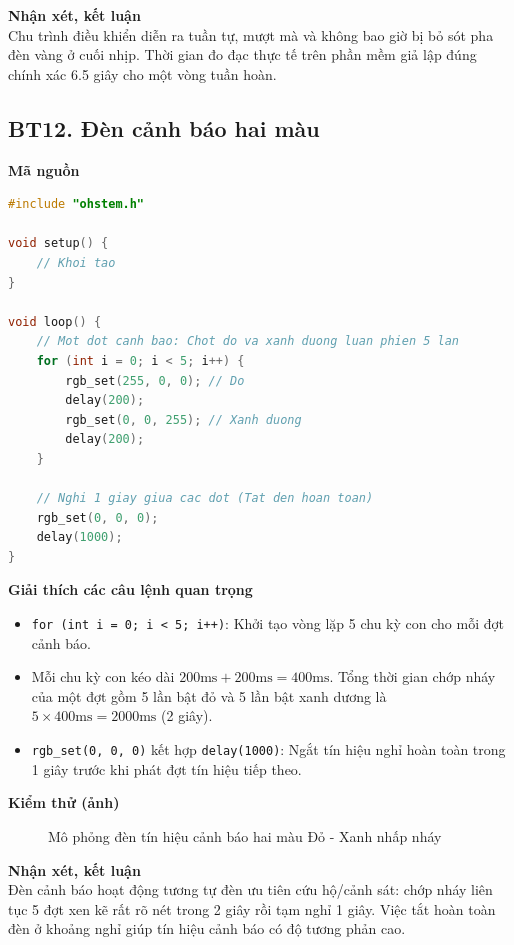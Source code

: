 \noindent\textbf{Nhận xét, kết luận}\\
Chu trình điều khiển diễn ra tuần tự, mượt mà và không bao giờ bị bỏ sót pha đèn vàng ở cuối nhịp. Thời gian đo đạc thực tế trên phần mềm giả lập đúng chính xác 6.5 giây cho một vòng tuần hoàn.


\subsection*{BT12. Đèn cảnh báo hai màu}

\noindent\textbf{Mã nguồn}\\
\begin{lstlisting}[language=C]
#include "ohstem.h"

void setup() {
    // Khoi tao
}

void loop() {
    // Mot dot canh bao: Chot do va xanh duong luan phien 5 lan
    for (int i = 0; i < 5; i++) {
        rgb_set(255, 0, 0); // Do
        delay(200);
        rgb_set(0, 0, 255); // Xanh duong
        delay(200);
    }

    // Nghi 1 giay giua cac dot (Tat den hoan toan)
    rgb_set(0, 0, 0);
    delay(1000);
}
\end{lstlisting}

\noindent\textbf{Giải thích các câu lệnh quan trọng}\\
\begin{itemize}
    \item \texttt{for (int i = 0; i < 5; i++)}: Khởi tạo vòng lặp 5 chu kỳ con cho mỗi đợt cảnh báo.
    \item Mỗi chu kỳ con kéo dài $200\text{ms} + 200\text{ms} = 400\text{ms}$. Tổng thời gian chớp nháy của một đợt gồm 5 lần bật đỏ và 5 lần bật xanh dương là $5 \times 400\text{ms} = 2000\text{ms}$ (2 giây).
    \item \texttt{rgb\_set(0, 0, 0)} kết hợp \texttt{delay(1000)}: Ngắt tín hiệu nghỉ hoàn toàn trong 1 giây trước khi phát đợt tín hiệu tiếp theo.
\end{itemize}

\noindent\textbf{Kiểm thử (ảnh)}\\
\begin{figure}[H]
    \centering
    \caption{Mô phỏng đèn tín hiệu cảnh báo hai màu Đỏ - Xanh nhấp nháy}
    \label{fig:bt12}
\end{figure}

\noindent\textbf{Nhận xét, kết luận}\\
Đèn cảnh báo hoạt động tương tự đèn ưu tiên cứu hộ/cảnh sát: chớp nháy liên tục 5 đợt xen kẽ rất rõ nét trong 2 giây rồi tạm nghỉ 1 giây. Việc tắt hoàn toàn đèn ở khoảng nghỉ giúp tín hiệu cảnh báo có độ tương phản cao.
